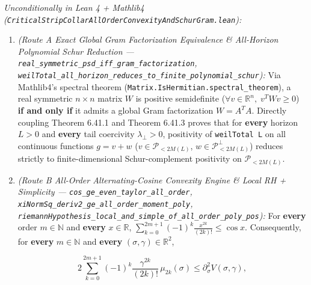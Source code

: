 \documentclass[
  11pt,
]{article}
\begin{document}
\emph{Unconditionally in Lean 4 + Mathlib4
(\texttt{CriticalStripCollarAllOrderConvexityAndSchurGram.lean}):}

\begin{enumerate}
\def\labelenumi{\arabic{enumi}.}
\item
  \emph{(Route A Exact Global Gram Factorization Equivalence \&
  All-Horizon Polynomial Schur Reduction ---
  \texttt{real\_symmetric\_psd\_iff\_gram\_factorization},
  \texttt{weilTotal\_all\_horizon\_reduces\_to\_finite\_polynomial\_schur}):}
  Via Mathlib4's spectral theorem
  (\texttt{Matrix.IsHermitian.spectral\_theorem}), a real symmetric
  \(n \times n\) matrix \(W\) is positive semidefinite
  (\(\forall v \in \mathbb{R}^n,\; v^T W v \ge 0\)) \textbf{if and only
  if} it admits a global Gram factorization \(W = A^T A\). Directly
  coupling Theorem 6.41.1 and Theorem 6.41.3 proves that for
  \textbf{every} horizon \(L > 0\) and \textbf{every} tail coercivity
  \(\lambda_\perp > 0\), positivity of \texttt{weilTotal\ L} on all
  continuous functions \(g = v + w\) (\(v \in \mathcal{P}_{<2M(L)}\),
  \(w \in \mathcal{P}_{<2M(L)}^\perp\)) reduces strictly to
  finite-dimensional Schur-complement positivity on
  \(\mathcal{P}_{<2M(L)}\).
\item
  \emph{(Route B All-Order Alternating-Cosine Convexity Engine \& Local
  RH + Simplicity --- \texttt{cos\_ge\_even\_taylor\_all\_order},
  \texttt{xiNormSq\_deriv2\_ge\_all\_order\_moment\_poly},
  \texttt{riemannHypothesis\_local\_and\_simple\_of\_all\_order\_poly\_pos}):}
  For \textbf{every} order \(m \in \mathbb{N}\) and \textbf{every}
  \(x \in \mathbb{R}\),
  \(\sum_{k=0}^{2m+1} (-1)^k \frac{x^{2k}}{(2k)!} \le \cos x\).
  Consequently, for \textbf{every} \(m \in \mathbb{N}\) and
  \textbf{every} \((\sigma, \gamma) \in \mathbb{R}^2\),

  \[2\sum_{k=0}^{2m+1} (-1)^k \frac{\gamma^{2k}}{(2k)!}\,\mu_{2k}(\sigma) \le \partial_\sigma^2 V(\sigma, \gamma),\]


\end{enumerate}
\end{document}
